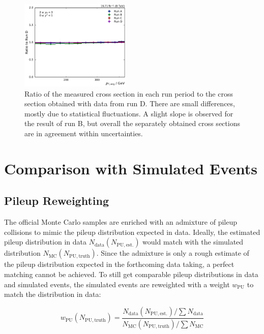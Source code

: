 \begin{figure}[htbp]
    \includegraphics[width=0.47\textwidth]{figures/measurement/run_comparison_yb2ys0.pdf}
    \caption[Stability of result over all run periods]{Ratio of the measured
    cross section in each run period to the cross section obtained with data
    from run D. There are small differences, mostly due to statistical fluctuations.
    A slight slope is observed for the result of run B, but overall the separately
    obtained cross sections are in agreement within uncertainties.}
    \label{fig:run_comparison}
\end{figure}

\section{Comparison with Simulated Events}
\label{sec:simulated_events}

\subsection{Pileup Reweighting}

The official Monte Carlo samples are enriched with an admixture of pileup
collisions to mimic the pileup distribution expected in data. Ideally, the
estimated pileup distribution in data $N_\mathrm{data} (N_\mathrm{PU, est.})$
would match with the simulated distribution $N_\mathrm{MC} (N_\mathrm{PU,
truth})$. Since the admixture is only a rough estimate of the pileup
distribution expected in the forthcoming data taking, a perfect matching cannot
be achieved. To still get comparable pileup distributions in data and simulated
events, the simulated events are reweighted with a weight $w_\mathrm{PU}$ to
match the distribution in data: 

\begin{equation*}
    w_{\mathrm{PU}} (N_{\mathrm{PU, truth}}) = \frac{N_\mathrm{data}
    (N_\mathrm{PU, est.}) / \sum N_\mathrm{data}}{N_\mathrm{MC}
    (N_\mathrm{PU, truth}) / \sum N_\mathrm{MC}}
\end{equation*}

